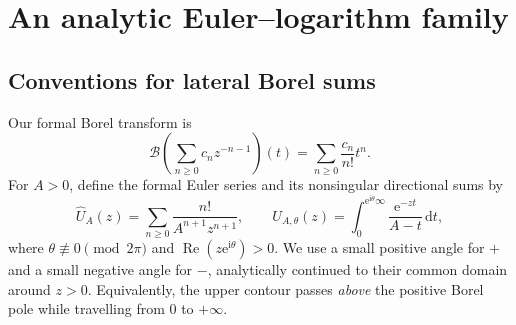 \documentclass[11pt,a4paper]{article}
\numberwithin{equation}{section}
\theoremstyle{definition}
\theoremstyle{remark}
\newcommand{\e}{\mathrm e}
\newcommand{\ii}{\mathrm i}
\newcommand{\dd}{\,\mathrm d}
\newcommand{\B}{\mathcal B}
\DeclareMathOperator{\Rea}{Re}
\begin{document}
\section{An analytic Euler--logarithm family}
\label{sec:euler}

\subsection{Conventions for lateral Borel sums}
Our formal Borel transform is
\begin{equation}
 \B\left(\sum_{n\geq0}c_nz^{-n-1}\right)(t)
 =\sum_{n\geq0}\frac{c_n}{n!}t^n.
 \label{eq:borel}
\end{equation}
For $A>0$, define the formal Euler series and its nonsingular directional sums by
\begin{equation}
 \widehat U_A(z)=\sum_{n\geq0}\frac{n!}{A^{n+1}z^{n+1}},
 \qquad
 U_{A,\theta}(z)=\int_0^{\e^{\ii\theta}\infty}
 \frac{\e^{-zt}}{A-t}\dd t,
 \label{eq:euler}
\end{equation}
where $\theta\not\equiv0\pmod{2\pi}$ and $\Rea(z\e^{\ii\theta})>0$. We use a small positive angle for $+$ and a small negative angle for $-$, analytically continued to their common domain around $z>0$. Equivalently, the upper contour passes \emph{above} the positive Borel pole while travelling from $0$ to $+\infty$.
\end{document}
